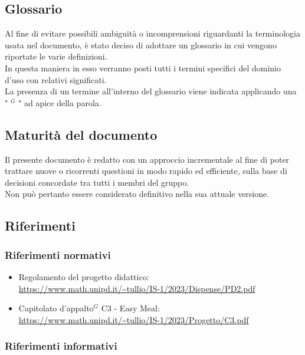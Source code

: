     \subsection{Glossario}

    Al fine di evitare possibili ambiguità o incomprensioni riguardanti la terminologia usata nel documento, è stato deciso di adottare un glossario in cui vengono riportate le varie definizioni.  \\
    In questa maniera in esso verranno posti tutti i termini specifici del dominio d’uso con relativi significati. \\
    La presenza di un termine all’interno del glossario viene indicata applicando una " $^{G}$ " ad apice della parola.


    \subsection{Maturità del documento}

    Il presente documento è redatto con un approccio incrementale al fine di poter trattare nuove o ricorrenti questioni in modo rapido ed efficiente, sulla base di decisioni concordate tra tutti i membri del gruppo.  \\
    Non può pertanto essere considerato definitivo nella sua attuale versione.

    \subsection{Riferimenti}

        \subsubsection{Riferimenti normativi}

        \begin{itemize}
            \item Regolamento del progetto didattico: \\
            \url{https://www.math.unipd.it/~tullio/IS-1/2023/Dispense/PD2.pdf}
            \item Capitolato d’appalto$^{G}$ C3 - Easy Meal: \\
            \url{https://www.math.unipd.it/~tullio/IS-1/2023/Progetto/C3.pdf}
        \end{itemize}
        
        \subsubsection{Riferimenti informativi}

